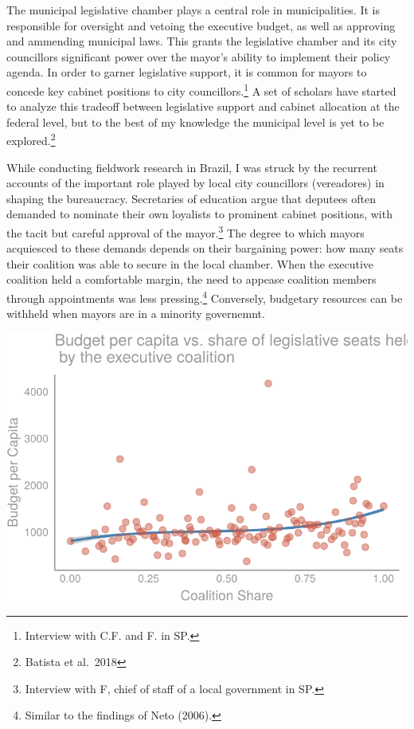\documentclass[12pt,]{article}
\let\rmarkdownfootnote\footnote%
\def\footnote{\protect\rmarkdownfootnote}
\begin{document}
The municipal legislative chamber plays a central role in
municipalities. It is responsible for oversight and vetoing the
executive budget, as well as approving and ammending municipal laws.
This grants the legislative chamber and its city councillors significant
power over the mayor's ability to implement their policy agenda. In
order to garner legislative support, it is common for mayors to concede
key cabinet positions to city councillors.\footnote{Interview with C.F.
  and F. in SP.} A set of scholars have started to analyze this tradeoff
between legislative support and cabinet allocation at the federal level,
but to the best of my knowledge the municipal level is yet to be
explored.\footnote{Batista et al.~2018}

While conducting fieldwork research in Brazil, I was struck by the
recurrent accounts of the important role played by local city
councillors (vereadores) in shaping the bureaucracy. Secretaries of
education argue that deputees often demanded to nominate their own
loyalists to prominent cabinet positions, with the tacit but careful
approval of the mayor.\footnote{Interview with F, chief of staff of a
  local government in SP.} The degree to which mayors acquiesced to
these demands depends on their bargaining power: how many seats their
coalition was able to secure in the local chamber. When the executive
coalition held a comfortable margin, the need to appease coalition
members through appointments was less pressing.\footnote{Similar to the
  findings of Neto (2006).} Conversely, budgetary resources can be
withheld when mayors are in a minority governemnt.

\begin{center}\includegraphics{dissertation_files/figure-latex/budget-1} \end{center}
\end{document}
